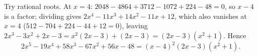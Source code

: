 Try rational roots. At $x=4$: $2048-4864+3712-1072+224-48=0$, so $x-4$ is a factor; dividing gives $2x^4-11x^3+14x^2-11x+12$, which also vanishes at $x=4$ ($512-704+224-44+12=0$), leaving $2x^3-3x^2+2x-3=x^2(2x-3)+(2x-3)=(2x-3)\left(x^2+1\right)$. Hence
\[2x^5-19x^4+58x^3-67x^2+56x-48=\boxed{(x-4)^2(2x-3)\left(x^2+1\right)}.\]
